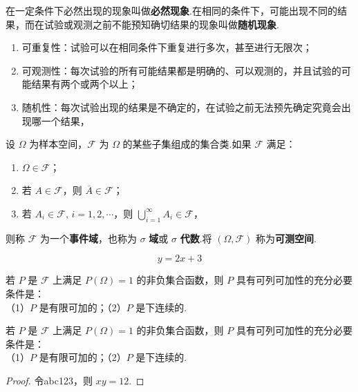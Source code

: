 \documentclass[zihao=-4,fontset=windows]{MyBeautybook-CN}
\begin{document}
    在一定条件下必然出现的现象叫做\textbf{必然现象}.在相同的条件下，可能出现不同的结果，而在试验或观测之前不能预知确切结果的现象叫做\textbf{随机现象}.

    \begin{enumerate}
        \item 可重复性：试验可以在相同条件下重复进行多次，甚至进行无限次；
        \item 可观测性：每次试验的所有可能结果都是明确的、可以观测的，并且试验的可能结果有两个或两个以上；
        \item 随机性：每次试验出现的结果是不确定的，在试验之前无法预先确定究竟会出现哪一个结果，
    \end{enumerate}

    \begin{definition}
        设 $\varOmega$ 为样本空间，$\mathcal{F}$ 为 $\varOmega$ 的某些子集组成的集合类.如果 $\mathcal{F}$ 满足：
        \begin{enumerate}
            \item $\varOmega \in \mathcal{F}$；
            \item 若 $A \in \mathcal{F}$，则 $\overline{A} \in \mathcal{F}$；
            \item 若 $A_i \in \mathcal{F}, \, i=1,2,\cdots$，则 $\displaystyle\bigcup_{i=1}^\infty A_i \in \mathcal{F}$，
        \end{enumerate}
        则称 $\mathcal{F}$ 为一个\textbf{事件域}，也称为 $\sigma$ \textbf{域}或 $\sigma$ \textbf{代数}.将 $(\varOmega, \mathcal{F})$ 称为\textbf{可测空间}.
    \end{definition}

    $$
    y=2x+3
    $$

    \begin{theorem}
        若 $P$ 是 $\mathcal{F}$ 上满足 $P(\varOmega) = 1$ 的非负集合函数，则 $P$ 具有可列可加性的充分必要条件是：\\
        （1）$P$ 是有限可加的；（2）$P$ 是下连续的.
    \end{theorem}

    \begin{lemma}
        若 $P$ 是 $\mathcal{F}$ 上满足 $P(\varOmega) = 1$ 的非负集合函数，则 $P$ 具有可列可加性的充分必要条件是：\\
        （1）$P$ 是有限可加的；（2）$P$ 是下连续的.
    \end{lemma}

    \begin{proof}
        令abc123，则 $xy=12$.
    \end{proof}
\end{document}
